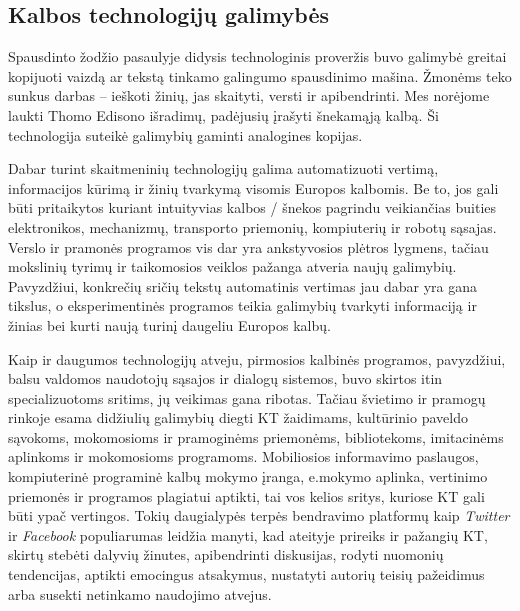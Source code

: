\begin{multicols}{2}
\subsection{Kalbos technologijų galimybės}

Spausdinto žodžio pasaulyje didysis technologinis proveržis buvo galimybė greitai kopijuoti vaizdą ar tekstą  tinkamo galingumo spausdinimo mašina. Žmonėms teko sunkus darbas – ieškoti žinių, jas skaityti, versti ir apibendrinti. Mes norėjome laukti Thomo Edisono išradimų, padėjusių įrašyti šnekamąją kalbą. Ši technologija suteikė galimybių gaminti analogines kopijas.

Dabar turint skaitmeninių technologijų galima automatizuoti vertimą, informacijos kūrimą ir žinių tvarkymą visomis Europos kalbomis. Be to, jos gali būti pritaikytos kuriant intuityvias kalbos / šnekos pagrindu veikiančias buities elektronikos, mechanizmų, transporto priemonių, kompiuterių ir robotų sąsajas. Verslo ir pramonės programos vis dar yra ankstyvosios plėtros lygmens, tačiau mokslinių tyrimų ir taikomosios veiklos pažanga atveria naujų galimybių. Pavyzdžiui, konkrečių sričių tekstų automatinis vertimas jau dabar yra gana tikslus, o eksperimentinės programos teikia galimybių tvarkyti informaciją ir žinias bei kurti naują turinį daugeliu Europos kalbų. 

 Kaip ir daugumos technologijų atveju, pirmosios kalbinės programos, pavyzdžiui, balsu valdomos naudotojų sąsajos ir dialogų sistemos, buvo skirtos itin specializuotoms sritims, jų veikimas gana ribotas. Tačiau švietimo ir pramogų rinkoje esama didžiulių galimybių diegti KT žaidimams, kultūrinio paveldo sąvokoms, mokomosioms ir pramoginėms priemonėms, bibliotekoms, imitacinėms aplinkoms ir mokomosioms programoms. Mobiliosios informavimo paslaugos, kompiuterinė programinė kalbų mokymo įranga, e.mokymo aplinka, vertinimo priemonės ir programos plagiatui aptikti, tai vos kelios sritys, kuriose KT gali būti ypač vertingos. Tokių daugialypės terpės bendravimo platformų kaip \textit{Twitter} ir \textit{Facebook} populiarumas leidžia manyti, kad ateityje prireiks ir pažangių KT, skirtų stebėti dalyvių žinutes, apibendrinti diskusijas, rodyti nuomonių tendencijas, aptikti emocingus atsakymus, nustatyti autorių teisių pažeidimus arba susekti netinkamo naudojimo atvejus.



\end{multicols}
